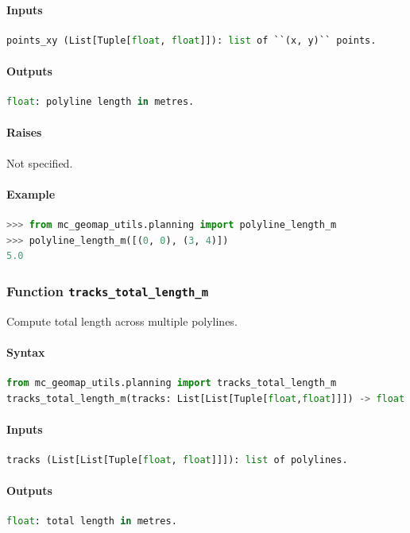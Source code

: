 \documentclass[11pt]{article}
\begin{document}
\paragraph{Inputs}
\begin{lstlisting}[language=Python]
points_xy (List[Tuple[float, float]]): list of ``(x, y)`` points.
\end{lstlisting}
\paragraph{Outputs}
\begin{lstlisting}[language=Python]
float: polyline length in metres.
\end{lstlisting}
\paragraph{Raises}
Not specified.
\paragraph{Example}
\begin{lstlisting}[language=Python]
>>> from mc_geomap_utils.planning import polyline_length_m
>>> polyline_length_m([(0, 0), (3, 4)])
5.0
\end{lstlisting}

\subsubsection{Function \texttt{tracks\_total\_length\_m}}
Compute total length across multiple polylines.

\paragraph{Syntax}
\begin{lstlisting}[language=Python]
from mc_geomap_utils.planning import tracks_total_length_m
tracks_total_length_m(tracks: List[List[Tuple[float,float]]]) -> float
\end{lstlisting}
\paragraph{Inputs}
\begin{lstlisting}[language=Python]
tracks (List[List[Tuple[float, float]]]): list of polylines.
\end{lstlisting}
\paragraph{Outputs}
\begin{lstlisting}[language=Python]
float: total length in metres.
\end{lstlisting}
\end{document}
